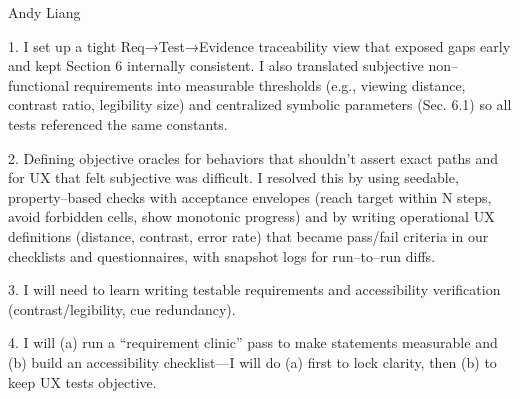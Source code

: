 \documentclass[12pt, titlepage]{article}
\begin{document}
Andy Liang

1. I set up a tight Req→Test→Evidence traceability view that exposed gaps early and kept Section 6 internally consistent. I also translated subjective non--functional requirements into measurable thresholds (e.g., viewing distance, contrast ratio, legibility size) and centralized symbolic parameters (Sec. 6.1) so all tests referenced the same constants.

2. Defining objective oracles for behaviors that shouldn’t assert exact paths and for UX that felt subjective was difficult. I resolved this by using seedable, property--based checks with acceptance envelopes (reach target within N steps, avoid forbidden cells, show monotonic progress) and by writing operational UX definitions (distance, contrast, error rate) that became pass/fail criteria in our checklists and questionnaires, with snapshot logs for run--to--run diffs.

3. I will need to learn writing testable requirements and accessibility verification (contrast/legibility, cue redundancy).

4. I will (a) run a “requirement clinic” pass to make statements measurable and (b) build an accessibility checklist—I will do (a) first to lock clarity, then (b) to keep UX tests objective.
\end{document}
